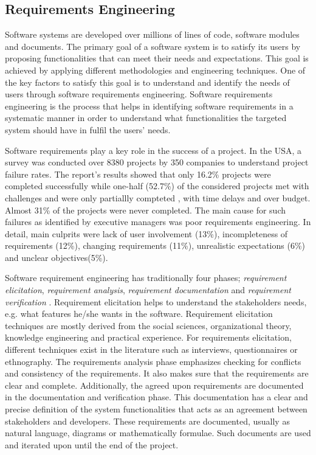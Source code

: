 \subsection{Requirements Engineering}

Software systems are developed over millions of lines of code, software modules
and documents. The primary goal of a software system is to satisfy its users by
proposing functionalities that can meet their needs and expectations. This goal
is achieved by applying different methodologies and engineering techniques. One
of the key factors to satisfy this goal is to understand and identify the needs
of users through software requirements engineering. Software requirements
engineering is the process that helps in identifying software requirements in a
systematic manner in order to understand what functionalities the targeted
system should have in fulfil the users' needs.\par Software requirements play a
key role in the success of a project. In the USA, a survey was conducted over
8380 projects by 350 companies to understand project failure rates. The report's
results \cite{StandishReport} showed that only 16.2\% projects were completed
successfully while one-half (52.7\%) of the considered projects met with
challenges and were only partiallly compteted , with time delays and over
budget. Almost 31\% of the projects were never completed. The main cause for
such failures as identified by executive managers was poor requirements
engineering. In detail, main culprits were lack of user involvement (13\%),
incompleteness of requirements (12\%), changing requirements (11\%), unrealistic
expectations (6\%) and unclear objectives(5\%).

Software requirement engineering has traditionally four phases;
\emph{requirement elicitation}, \emph{requirement analysis}, \emph{requirement documentation} and
\emph{requirement verification} \cite {Kotonya:1998}. Requirement elicitation
\cite{Coughlan:2002, Zowghi2005} helps to understand the
stakeholders needs, e.g. what features he/she wants in the software.
Requirement elicitation techniques are mostly derived from the social sciences,
organizational theory, knowledge engineering and practical experience. For
requirements elicitation, different techniques exist in the literature such as
interviews, questionnaires or ethnography.
The requirements analysis \cite{Nuseibeh:2000} phase emphasizes checking for
conflicts and consistency of the requirements. It also makes sure that the
requirements are clear and complete. Additionally, the agreed upon requirements
are documented in the documentation and verification phase. This documentation
has a clear and precise definition of the system functionalities that acts as an
agreement between stakeholders and developers. These requirements are
documented, usually as natural language, diagrams or mathematically formulae.
Such documents are used and iterated upon until the end of the project.

